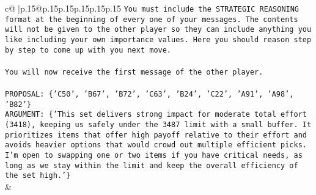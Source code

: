 \documentclass{article}
\begin{document}
{\begin{supertabular}{c@{$\;$}|p{.15\linewidth}@{}p{.15\linewidth}p{.15\linewidth}p{.15\linewidth}p{.15\linewidth}p{.15\linewidth}}
{{{\texttt{You must include the STRATEGIC REASONING format at the beginning of every one of your messages. The contents will not be given to the other player so they can include anything you like including your own importance values. Here you should reason step by step to come up with you next move.} \\
\\ 
\texttt{You will now receive the first message of the other player.} \\
\\ 
\texttt{PROPOSAL: \{'C50', 'B67', 'B72', 'C63', 'B24', 'C22', 'A91', 'A98', 'B82'\}} \\
\texttt{ARGUMENT: \{'This set delivers strong impact for moderate total effort (3418), keeping us safely under the 3487 limit with a small buffer. It prioritizes items that offer high payoff relative to their effort and avoids heavier options that would crowd out multiple efficient picks. I’m open to swapping one or two items if you have critical needs, as long as we stay within the limit and keep the overall efficiency of the set high.'\}} \\
            }
        }
    }
    & \\ \\


\end{supertabular}}
\end{document}
